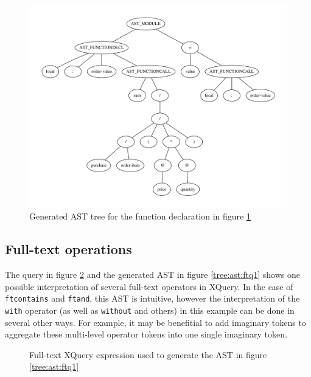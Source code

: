 \begin{figure}[h]
\centering
 \includegraphics[width=1\textwidth]{img/graphs/funcdecl1}
\caption{Generated AST tree for the function declaration in figure \ref{tree:ast:funcdecl1}}
\label{tree:ast:funcdecl1}
\end{figure}

\subsection{Full-text operations}
The query in figure \ref{code:xq:ftq1} and the generated AST in figure
\ref{tree:ast:ftq1} shows one possible interpretation of several full-text 
operators in XQuery. In the case of \verb!ftcontains! and \verb!ftand!, this AST
is intuitive, however the interpretation of the \verb!with! operator (as well
as \verb!without! and others) in this example can be done in several other ways.
For example, it may be benefitial to add imaginary tokens to aggregate these
multi-level operator tokens into one single imaginary token.

\begin{figure}[h]

\caption{Full-text XQuery expression used to generate the AST in figure
\ref{tree:ast:ftq1}}
\label{code:xq:ftq1}
\end{figure}

